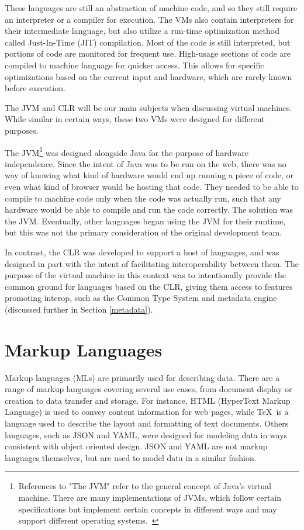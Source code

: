 \documentclass{sig-alternate}
\begin{document}
These languages are still an abstraction of machine code, and so they still require an interpreter or a compiler for execution.
The VMs also contain interpreters for their intermediate language, but also utilize a run-time optimization method called Just-In-Time (JIT) compilation. Most of the code is still interpreted, but portions of code are monitored for frequent use. High-usage sections of code are compiled to machine language for quicker access. This allows for specific optimizations based on the current input and hardware, which are rarely known before execution.~\cite{wiki:JIT}



The JVM and CLR will be our main subjects when discussing virtual machines. While similar in certain ways, these two VMs were designed for different purposes.

The JVM\footnote{References to "The JVM" refer to the general concept of Java's virtual machine. There are many implementations of JVMs, which follow certain specifications but implement certain concepts in different ways and may support different operating systems.~\cite{wiki:multiJVM, wiki:JVM}}
was designed alongside Java for the purpose of hardware independence. Since the intent of Java was to be run on the web, there was no way of knowing what kind of hardware would end up running a piece of code, or even what kind of browser would be hosting that code. They needed to be able to compile to machine code only when the code was actually run, such that any hardware would be able to compile and run the code correctly. The solution was the JVM. Eventually, other languages began using the JVM for their runtime, but this was not the primary consideration of the original development team.

In contrast, the CLR was developed to support a host of languages, and was designed in part with the intent of facilitating interoperability between them. The purpose of the virtual machine in this context was to intentionally provide the common ground for languages based on the CLR, giving them access to features promoting interop, such as the Common Type System and metadata engine (discussed further in Section \ref{metadata}).


\section{Markup Languages}\label{ML}
Markup languages (MLs) are primarily used for describing data. There are a range of markup languages covering several use cases, from document display or creation to data transfer and storage. For instance, HTML (HyperText Markup Language) is used to convey content information for web pages, while \TeX~is a language used to describe the layout and formatting of text documents.
Others languages, such as JSON and YAML, were designed for modeling data in ways consistent with object oriented design. JSON and YAML are not markup languages themselves, but are used to model data in a similar fashion.
\end{document}

